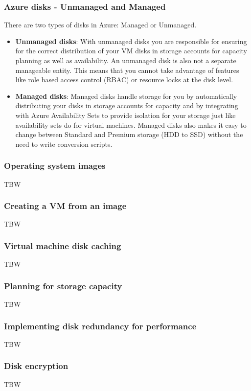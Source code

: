 \documentclass[12pt]{article}
\begin{document}
\subsubsection{Azure disks - Unmanaged and Managed}
There are two types of disks in Azure: Managed or Unmanaged.
\begin{itemize}
    \item \textbf{Unmanaged disks}: With unmanaged disks you are responsible for ensuring for the correct distribution of your VM disks in storage accounts for capacity planning as well as availability. An unmanaged disk is also not a separate manageable entity. This means that you cannot take advantage of features like role based access control (RBAC) or resource locks at the disk level.
    \item \textbf{Managed disks}: Managed disks handle storage for you by automatically distributing your disks in storage accounts for capacity and by integrating with Azure Availability Sets to provide isolation for your storage just like availability sets do for virtual machines. Managed disks also makes it easy to change between Standard and Premium storage (HDD to SSD) without the need to write conversion scripts.
\end{itemize}

\subsubsection{Operating system images}
TBW

\subsubsection{Creating a VM from an image}
TBW

\subsubsection{Virtual machine disk caching}
TBW

\subsubsection{Planning for storage capacity}
TBW

\subsubsection{Implementing disk redundancy for performance}
TBW

\subsubsection{Disk encryption}
TBW
\end{document}
